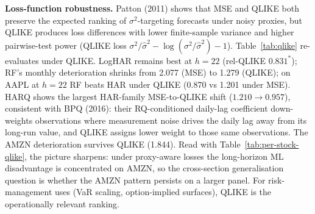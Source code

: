 \documentclass[twocolumn,9pt]{extarticle}
\newcommand{\lead}[1]{\textbf{#1}\hspace{0.25em}\ignorespaces}
\begin{document}
\lead{Loss-function robustness.} Patton (2011) shows that MSE and
QLIKE both preserve the expected ranking of $\sigma^2$-targeting
forecasts under noisy proxies, but QLIKE produces loss differences
with lower finite-sample variance and higher pairwise-test power
(QLIKE loss $\sigma^2/\hat{\sigma}^2 - \log(\sigma^2/\hat{\sigma}^2)
- 1$). Table~\ref{tab:qlike} re-evaluates under QLIKE. LogHAR remains best at
$h=22$ (rel-QLIKE $0.831^{*}$); RF's monthly deterioration shrinks
from 2.077 (MSE) to 1.279 (QLIKE); on AAPL at $h=22$ RF beats HAR
under QLIKE (0.870 vs 1.201 under MSE). HARQ shows the largest
HAR-family MSE-to-QLIKE shift ($1.210\to0.957$), consistent with BPQ
(2016): their RQ-conditioned daily-lag coefficient down-weights
observations where measurement noise drives the daily lag away from
its long-run value, and QLIKE assigns lower weight to those same
observations. The AMZN deterioration survives QLIKE (1.844). Read
with Table~\ref{tab:per-stock-qlike}, the picture sharpens: under proxy-aware losses the
long-horizon ML disadvantage is concentrated on AMZN, so the
cross-section generalisation question is whether the AMZN pattern
persists on a larger panel. For risk-management uses (VaR scaling,
option-implied surfaces), QLIKE is the operationally relevant
ranking.
\end{document}
